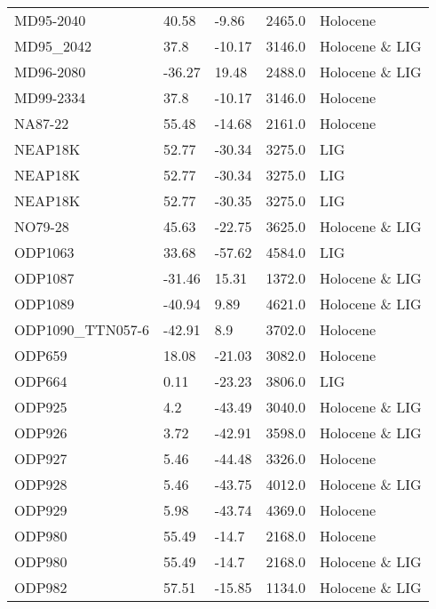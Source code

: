 \begin{longtable}{lllrl}
        MD95-2040 &    40.58 &     -9.86 &     2465.0 &        Holocene \\
        MD95\_2042 &     37.8 &    -10.17 &     3146.0 &  Holocene \& LIG \\
        MD96-2080 &   -36.27 &     19.48 &     2488.0 &  Holocene \& LIG \\
        MD99-2334 &     37.8 &    -10.17 &     3146.0 &        Holocene \\
          NA87-22 &    55.48 &    -14.68 &     2161.0 &        Holocene \\
          NEAP18K &    52.77 &    -30.34 &     3275.0 &             LIG \\
          NEAP18K &    52.77 &    -30.34 &     3275.0 &             LIG \\
          NEAP18K &    52.77 &    -30.35 &     3275.0 &             LIG \\
          NO79-28 &    45.63 &    -22.75 &     3625.0 &  Holocene \& LIG \\
          ODP1063 &    33.68 &    -57.62 &     4584.0 &             LIG \\
          ODP1087 &   -31.46 &     15.31 &     1372.0 &  Holocene \& LIG \\
          ODP1089 &   -40.94 &      9.89 &     4621.0 &  Holocene \& LIG \\
 ODP1090\_TTN057-6 &   -42.91 &       8.9 &     3702.0 &        Holocene \\
           ODP659 &    18.08 &    -21.03 &     3082.0 &        Holocene \\
           ODP664 &     0.11 &    -23.23 &     3806.0 &             LIG \\
           ODP925 &      4.2 &    -43.49 &     3040.0 &  Holocene \& LIG \\
           ODP926 &     3.72 &    -42.91 &     3598.0 &  Holocene \& LIG \\
           ODP927 &     5.46 &    -44.48 &     3326.0 &        Holocene \\
           ODP928 &     5.46 &    -43.75 &     4012.0 &  Holocene \& LIG \\
           ODP929 &     5.98 &    -43.74 &     4369.0 &        Holocene \\
           ODP980 &    55.49 &     -14.7 &     2168.0 &        Holocene \\
           ODP980 &    55.49 &     -14.7 &     2168.0 &  Holocene \& LIG \\
           ODP982 &    57.51 &    -15.85 &     1134.0 &  Holocene \& LIG \\

\end{longtable}
